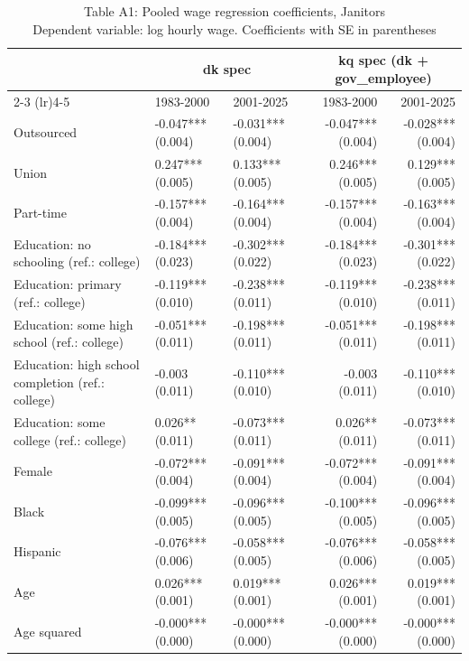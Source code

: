 \begin{table}[!t]
\caption*{
{\large Table A1: Pooled wage regression coefficients, Janitors} \\
{\small Dependent variable: log hourly wage. Coefficients with SE in parentheses}
} 

\fontsize{10.0pt}{12.0pt}\selectfont

\begin{tabular*}{\linewidth}{@{\extracolsep{\fill}}l|llrr}
\toprule
  & \multicolumn{2}{c}{dk spec} & \multicolumn{2}{c}{kq spec (dk + gov\_employee)} \\ 
\cmidrule(lr){2-3} \cmidrule(lr){4-5}
  & 1983-2000 & 2001-2025 & 1983-2000 & 2001-2025 \\ 
\midrule\addlinespace[2.5pt]
Outsourced & -0.047*** (0.004) & -0.031*** (0.004) & -0.047*** (0.004) & -0.028*** (0.004) \\
Union & 0.247*** (0.005) & 0.133*** (0.005) & 0.246*** (0.005) & 0.129*** (0.005) \\
Part-time & -0.157*** (0.004) & -0.164*** (0.004) & -0.157*** (0.004) & -0.163*** (0.004) \\
Education: no schooling (ref.: college) & -0.184*** (0.023) & -0.302*** (0.022) & -0.184*** (0.023) & -0.301*** (0.022) \\
Education: primary (ref.: college) & -0.119*** (0.010) & -0.238*** (0.011) & -0.119*** (0.010) & -0.238*** (0.011) \\
Education: some high school (ref.: college) & -0.051*** (0.011) & -0.198*** (0.011) & -0.051*** (0.011) & -0.198*** (0.011) \\
Education: high school completion (ref.: college) & -0.003 (0.011) & -0.110*** (0.010) & -0.003 (0.011) & -0.110*** (0.010) \\
Education: some college (ref.: college) & 0.026** (0.011) & -0.073*** (0.011) & 0.026** (0.011) & -0.073*** (0.011) \\
Female & -0.072*** (0.004) & -0.091*** (0.004) & -0.072*** (0.004) & -0.091*** (0.004) \\
Black & -0.099*** (0.005) & -0.096*** (0.005) & -0.100*** (0.005) & -0.096*** (0.005) \\
Hispanic & -0.076*** (0.006) & -0.058*** (0.005) & -0.076*** (0.006) & -0.058*** (0.005) \\
Age & 0.026*** (0.001) & 0.019*** (0.001) & 0.026*** (0.001) & 0.019*** (0.001) \\
Age squared & -0.000*** (0.000) & -0.000*** (0.000) & -0.000*** (0.000) & -0.000*** (0.000) \\

\end{tabular*}
\end{table}
